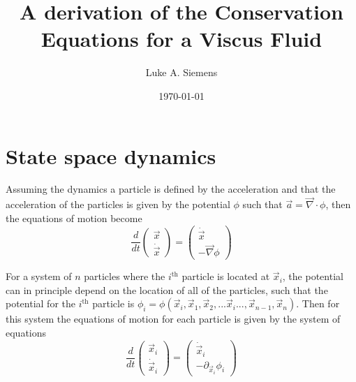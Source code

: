 \documentclass[%
 twocolumn,
 amsmath,amssymb,
 aps,
]{revtex4-1}
\newcommand{\dvec}[1]{\dot{\vec{#1}}}
\newcommand{\grad}{\vec{\nabla}}
\begin{document}
\title{A derivation of the Conservation Equations for a Viscus Fluid}%

\author{Luke A. Siemens}

\date{\today}

\maketitle

\section{State space dynamics}

Assuming the dynamics a particle is defined by the acceleration and that the acceleration of the particles is given by the potential $\phi$ such that $\vec{a} = \vec{\nabla}\cdot\phi$, then the equations of motion become
\[
\frac{d}{dt}\begin{pmatrix} \vec{x} \\ \dvec{x} \end{pmatrix}=\begin{pmatrix} \dvec{x} \\ -\grad\phi \end{pmatrix}
\]

For a system of $n$ particles where the $i^{\text{th}}$ particle is located at $\vec{x}_i$, the potential can in principle depend on the location of all of the particles, such that the potential for the $i^{\text{th}}$ particle is $\phi_i = \phi({\vec{x}_i, \vec{x}_1, \vec{x}_2, ... \vec{x}_i ... , \vec{x}_{n-1}, \vec{x}_n})$. Then for this system the equations of motion for each particle is given by the system of equations
\begin{equation}
\frac{d}{dt}\begin{pmatrix} \vec{x}_i \\ \dvec{x}_i \end{pmatrix}=\begin{pmatrix} \dvec{x}_i \\ -\partial_{\vec{x}_i}\phi_i \end{pmatrix}
\label{discrete_system_dynamics}
\end{equation}
\end{document}

